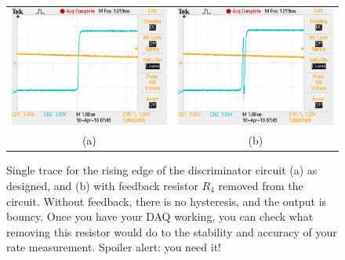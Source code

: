 \documentclass[12pt]{article}
\begin{document}
\begin{figure}[thbp]
\begin{center}
\begin{tabular}{cc}
{\includegraphics[height=0.25\textheight]{figs/schmitty.pdf}} &
{\includegraphics[height=0.25\textheight]{figs/bouncy.pdf}} \\
(a) & (b) \\
\end{tabular}
\caption{\label{fig:bounce} Single trace for the rising edge of the discriminator circuit (a) as designed, and (b) with feedback resistor $R_4$ removed from the circuit.  Without feedback, there is no hysteresis, and the output is bouncy.  Once you have your DAQ working, you can check what removing this resistor would do to the stability and accuracy of your rate measurement.  Spoiler alert:  you need it!}
\end{center}
\end{figure}
\end{document}
